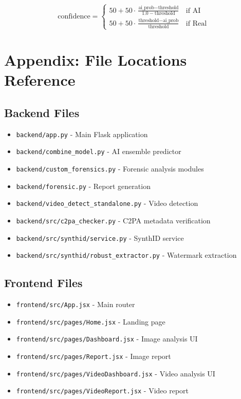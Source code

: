 \documentclass[12pt,a4paper]{book}
\begin{document}
\begin{itemize}
\begin{equation}
\text{confidence} = \begin{cases}
50 + 50 \cdot \frac{\text{ai\_prob} - \text{threshold}}{1.0 - \text{threshold}} & \text{if AI} \\
50 + 50 \cdot \frac{\text{threshold} - \text{ai\_prob}}{\text{threshold}} & \text{if Real}
\end{cases}
\end{equation}

\chapter{Appendix: File Locations Reference}
\label{app:files}

\section{Backend Files}

\begin{itemize}
    \item \texttt{backend/app.py} - Main Flask application
    \item \texttt{backend/combine\_model.py} - AI ensemble predictor
    \item \texttt{backend/custom\_forensics.py} - Forensic analysis modules
    \item \texttt{backend/forensic.py} - Report generation
    \item \texttt{backend/video\_detect\_standalone.py} - Video detection
    \item \texttt{backend/src/c2pa\_checker.py} - C2PA metadata verification
    \item \texttt{backend/src/synthid/service.py} - SynthID service
    \item \texttt{backend/src/synthid/robust\_extractor.py} - Watermark extraction
\end{itemize}

\section{Frontend Files}

\begin{itemize}
    \item \texttt{frontend/src/App.jsx} - Main router
    \item \texttt{frontend/src/pages/Home.jsx} - Landing page
    \item \texttt{frontend/src/pages/Dashboard.jsx} - Image analysis UI
    \item \texttt{frontend/src/pages/Report.jsx} - Image report
    \item \texttt{frontend/src/pages/VideoDashboard.jsx} - Video analysis UI
    \item \texttt{frontend/src/pages/VideoReport.jsx} - Video report
\end{itemize}


\end{itemize}
\end{document}
